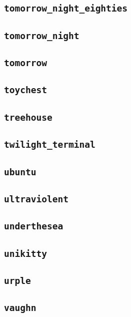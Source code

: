 \subsection{\texttt{tomorrow\_night\_eighties}}
\newpage
\subsection{\texttt{tomorrow\_night}}
\newpage
\subsection{\texttt{tomorrow}}
\newpage
\subsection{\texttt{toychest}}
\newpage
\subsection{\texttt{treehouse}}
\newpage
\subsection{\texttt{twilight\_terminal}}
\newpage
\subsection{\texttt{ubuntu}}
\newpage
\subsection{\texttt{ultraviolent}}
\newpage
\subsection{\texttt{underthesea}}
\newpage
\subsection{\texttt{unikitty}}
\newpage
\subsection{\texttt{urple}}
\newpage
\subsection{\texttt{vaughn}}
\newpage
